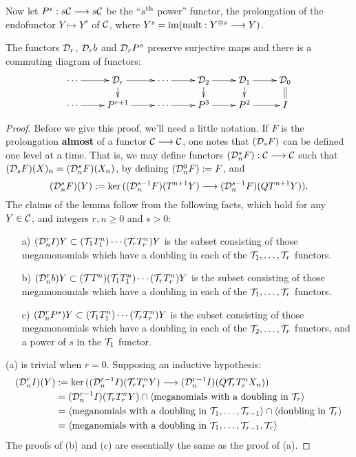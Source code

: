 \documentclass[11pt]{amsart}
\theoremstyle{plain}
\begin{document}
Now let $P^s:s\calC\to s\calC$ be the ``$s^\textup{th}$ power'' functor, the prolongation of the endofunctor $Y\mapsto Y^s$ of $\calC$, where $Y^s=\textup{im}(\textup{mult}:Y^{\otimes s}\to Y)$.
\begin{lem}\label{towerWithPowers}
The functors $\caldup{r}$, $\caldup{r}b$ and $\caldup{r}P^{s}$ preserve surjective maps and there is a commuting diagram of functors:
\[\xymatrix@R=4mm{
\cdots 
\ar[r]
&%
\caldup{r}
\ar[r]
\ar[d]
&%
\cdots \ar[r]
&%
\caldup{2}
\ar[r]
\ar[d]
&%
\caldup{1}
\ar[r]
\ar[d]&%
\caldup{0}
\ar@{=}[d]
\\%
\cdots
\ar[r]
&%
P^{r+1}
\ar[r]
&%
\cdots 
\ar[r]&%
P^3
\ar[r]
&P^2
\ar[r]
&%
I%
}\]
\end{lem}
\begin{shaded}\tiny
\begin{proof}
Before we give this proof, we'll need a little notation.
If $F$ is the prolongation \textbf{almost} of a functor $\calC\to\calC$, one notes that $(\caldup{s}F)$ can be defined one level at a time. That is,  we may define functors $(\caldupdown{s}{n}F):\calC\to\calC$ such that $(\caldup{s}F)(X)_n=(\caldupdown{s}{n}F)(X_n)$, by defining $(\caldupdown{0}{n}F):=F$, and
\[(\caldupdown{s}{n}F)(Y):=\ker((\caldupdown{s-1}{n}F)(T^{n+1}Y)\to (\caldupdown{s-1}{n}F)(QT^{n+1}Y)).\]
The claims of the lemma follow from the following facts, which hold for any $Y\in\calC$, and integers $r,n\geq0$ and $s>0$:
\begin{enumerate}
\squishlist
\setlength{\parindent}{.25in}
\item[a)] $(\caldupdown{r}{n}I)Y\subset (\calT_1T^n_1)\cdots (\calT_rT^n_r)Y$ is the subset consisting of those mega\-monomials which have a doubling in each of the $\calT_1,\ldots,\calT_r$ functors.
\item[b)] $(\caldupdown{r}{n}b)Y\subset (\calT T^n)(\calT_1T^n_1)\cdots (\calT_rT^n_r)Y$ is the subset consisting of those mega\-monomials which have a doubling in each of the $\calT_1,\ldots,\calT_r$ functors.
\item[c)] $(\caldupdown{r}{n}P^{s})Y\subset (\calT_1T^n_1)\cdots (\calT_rT^n_r)Y$ is the subset consisting of those mega\-monomials which have a doubling in each of the $\calT_2,\ldots,\calT_r$ functors, and a power of $s$ in the $\calT_1$ functor.
\end{enumerate}
(a) is trivial when $r=0$. Supposing an inductive hypothesis:
\begin{alignat*}{2}
(\caldupdown{r}{n}I)(Y)
&:=
\ker((\caldupdown{r-1}{n}I)(\calT_r T_r^n Y)\to (\caldupdown{r-1}{n}I) (Q\calT_rT_r^n X_n))%
\\
&=
(\caldupdown{r-1}{n}I)(\calT_r T_r^n Y)\cap\langle \textup{meganomials with a doubling in $\calT_r$}\rangle\\
&=
\langle \textup{meganomials with a doubling in $\calT_1,\ldots,\calT_{r-1}$}\rangle\cap\langle \textup{doubling in $\calT_r$}\rangle\\
&=
\langle \textup{meganomials with a doubling in $\calT_1,\ldots,\calT_{r-1},\calT_{r}$}\rangle
\end{alignat*}
The proofs of (b) and (c) are essentially the same as the proof of (a).
\end{proof}
\end{shaded}
\end{document}

